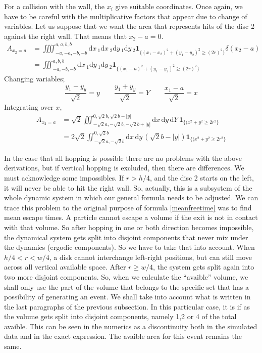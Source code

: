 \documentclass[superscriptaddress,pre,reprint,showpacs,onecolumn]{revtex4-1}
\newcommand{\rd}[1]{\mathrm{d}{#1} \,}
\newcommand{\indicatorsymbol}{\mathbf{1}}
\newcommand{\indicator}[1]{\indicatorsymbol_{ \{   #1 \} } }
\begin{document}
    For a collision with the wall, the $x_i$ give suitable coordinates. Once again, we
    have to be careful with the multiplicative factors that appear due to change
    of variables. Let us suppose that we want the area that represents hits of
    the disc 2 against the right wall. That means that $x_2-a=0$. 
    \begin{align}
      A_{x_2=a} & =\iiiint_{-a,-a,-b,-b}^{a,a,b,b} \rd x_1 \rd x_2 \rd y_1 \rd y_2 
      \indicator{(x_1-x_2)^2+(y_1-y_2)^2 \geq (2 r)^2} \delta (x_2-a)\\
      &=\iiint_{-a,-b,-b}^{a,b,b} \rd x_1  \rd y_1 \rd y_2 
      \indicator{(x_1-a)^2+(y_1-y_2)^2 \geq (2 r)^2} 
    \end{align}
    Changing variables;
    \begin{equation}
      \frac{y_1-y_y}{\sqrt{2}} =  y  \qquad \frac{y_1+y_y}{\sqrt{2}}=Y \qquad \frac{x_1-a}{\sqrt{2}}=x
    \end{equation}
    Integrating over $x$,
    \begin{align}\label{areachoquexy}
      A_{x_2=a} & =\sqrt{2}\iiint_{-\sqrt{2}a,-\sqrt{2}b,-\sqrt{2}b+|y]}^{0,\sqrt{2}b,\sqrt{2}b-|y|}
        \rd x \rd y \rd Y 
      \indicator{(x^2+y^2 \geq 2 r^2} \\
      &=2\sqrt{2}\iint_{-\sqrt{2}a,-\sqrt{2}b}^{0,\sqrt{2}b}
        \rd x \rd y (\sqrt{2} b - |y|)
      \indicator{(x^2+y^2 \geq 2 r^2}
    \end{align}
    
    
    In the case that all hopping is possible there are no problems with the above derivations,
    but if vertical hopping is excluded, then there are differences.
    We must acknowledge some impossibles. If $r>h/4$, and the disc 2 starts
    on the left, it will never be able to hit the right wall. So, actually, this
    is a subsystem of the whole dynamic system in which our general formula needs
    to be adjusted. We can trace this problem to the original purpose of
    formula \ref{meanfreetime}
    was to find mean escape times. A particle cannot escape a volume if the exit is
    not in contact with that volume. So after hopping in one or both direction
    becomes impossible, the dynamical system gets split into disjoint components
    that never mix under the dynamics (ergodic components). So we have to take that
    into account. When $h/4<r<w/4$, a disk cannot interchange left-right positions,
    but can still move across all vertical available space.  After $r\geq w/4$,
    the system gets split again into two more disjoint components.
    So, when we calculate the ``avaible'' volume, we shall only use the
    part of the volume that belongs to the specific set that has a possibility of
    generating an event. We shall take into account what is written in the last
    paragraphs of the previous subsection. In this particular case, it is
    if as the volume gets split into disjoint components, namely 1,2 or 4 of the
    total avaible. This can be seen in the numerics as a discontinuity both
    in  the simulated data and in the exact expression. The avaible area
    for this event remains the same. 
    
\end{document}
